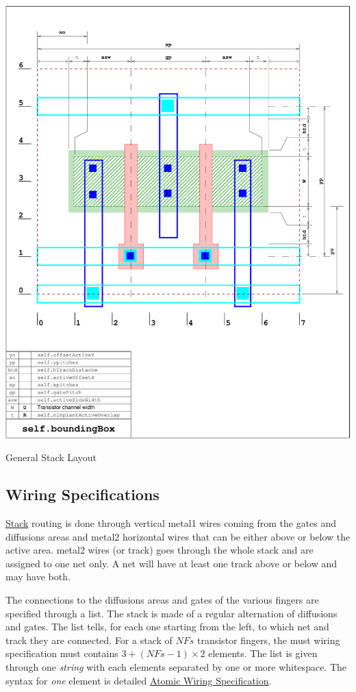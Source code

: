  
\begin{DoxyImage}
\includegraphics[width=.9\linewidth]{stack-layout-3}
\caption{General Stack Layout}
\end{DoxyImage}
\hypertarget{classpython_1_1Stack_1_1Stack_secWiringSpecs}{}\subsection{Wiring Specifications}\label{classpython_1_1Stack_1_1Stack_secWiringSpecs}
\hyperlink{classpython_1_1Stack_1_1Stack}{Stack} routing is done through vertical {\ttfamily metal1} wires coming from the gates and diffusions areas and {\ttfamily metal2} horizontal wires that can be either above or below the active area. {\ttfamily metal2} wires (or track) goes through the whole stack and are assigned to one net only. A net will have at least one track above or below and may have both.

The connections to the diffusions areas and gates of the various fingers are specified through a list. The stack is made of a regular alternation of diffusions and gates. The list tells, for each one starting from the left, to which net and track they are connected. For a stack of $NFs$ transistor fingers, the must wiring specification must contains $ 3 + (NFs-1) \times 2$ elements. The list is given through one {\itshape string} with each elements separated by one or more whitespace. The syntax for {\itshape one} element is detailed \hyperlink{classpython_1_1Stack_1_1Stack_secAtomicWiring}{Atomic Wiring Specification}.

